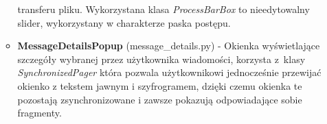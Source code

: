 \documentclass{article}
\begin{document}
\begin{itemize}
\begin{itemize}
              transferu pliku. Wykorzystana klasa \emph{ProcessBarBox} to nieedytowalny slider, wykorzystany w
              charakterze paska postępu.
          \item {\bfseries MessageDetailsPopup} (message\_details.py) - Okienka wyświetlające szczegóły wybranej przez
              użytkownika wiadomości, korzysta z~klasy \emph{SynchronizedPager} która pozwala użytkownikowi jednocześnie
              przewijać okienko z tekstem jawnym i szyfrogramem, dzięki czemu okienka te pozostają zsynchronizowane i
              zawsze pokazują odpowiadające sobie fragmenty.
      \end{itemize}
  \end{itemize}
\end{document}
